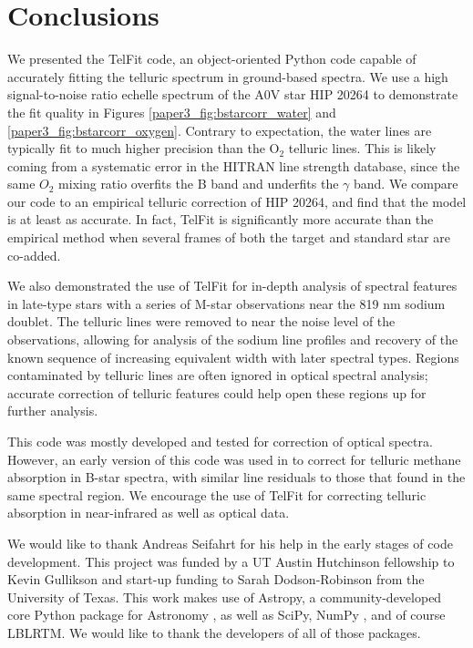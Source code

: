 \section{Conclusions}
\label{paper3_sec:conclusion}
We presented the TelFit code, an object-oriented Python code capable of accurately fitting the telluric spectrum in ground-based spectra. We use a high signal-to-noise ratio echelle spectrum of the A0V star HIP 20264 to demonstrate the fit quality in Figures \ref{paper3_fig:bstarcorr_water} and \ref{paper3_fig:bstarcorr_oxygen}. Contrary to expectation, the water lines are typically fit to much higher precision than the $\mathrm{O_2}$ telluric lines. This is likely coming from a systematic error in the HITRAN line strength database, since the same $O_2$ mixing ratio overfits the B band and underfits the $\gamma$ band. We compare our code to an empirical telluric correction of HIP 20264, and find that the model is at least as accurate. In fact, TelFit is significantly more accurate than the empirical method when several frames of both the target and standard star are co-added.

We also demonstrated the use of TelFit for in-depth analysis of spectral features in late-type stars with a series of M-star observations near the 819 nm sodium doublet. The telluric lines were removed to near the noise level of the observations, allowing for analysis of the sodium line profiles and recovery of the known sequence of increasing equivalent width with later spectral types. Regions contaminated by telluric lines are often ignored in optical spectral analysis; accurate correction of telluric features could help open these regions up for further analysis.

This code was mostly developed and tested for correction of optical spectra. However, an early version of this code was used in \cite{Gullikson2013} to correct for telluric methane absorption in B-star spectra, with similar line residuals to those that \cite{Seifahrt2011} found in the same spectral region. We encourage the use of TelFit for correcting telluric absorption in near-infrared as well as optical data.

We would like to thank Andreas Seifahrt for his help in the early stages of code development. This project was funded by a UT Austin Hutchinson fellowship to Kevin Gullikson and start-up funding to Sarah Dodson-Robinson from the University of Texas. This work makes use of Astropy, a community-developed core Python package for Astronomy \citep{Astropy}, as well as SciPy, NumPy \citep{Oliphant2007}, and of course LBLRTM. We would like to thank the developers of all of those packages.


